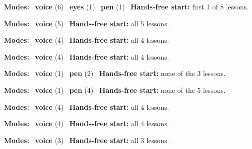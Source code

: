 \expandafter\def\csname hlchaptermodality6\endcsname{%
  {\small\noindent
    \textbf{Modes:} \hlvoicesign{}~\textbf{voice} (6) \quad \hlsightsign{}~\textbf{eyes} (1) \quad \hlpensign{}~\textbf{pen} (1)\quad
    \hlvoicesign{}~\textbf{Hands-free start:} first 1 of 8 lessons.%
    \par}\medskip
}

\expandafter\def\csname hlchaptermodality7\endcsname{%
  {\small\noindent
    \textbf{Modes:} \hlvoicesign{}~\textbf{voice} (5)\quad
    \hlvoicesign{}~\textbf{Hands-free start:} all 5 lessons.%
    \par}\medskip
}

\expandafter\def\csname hlchaptermodality8\endcsname{%
  {\small\noindent
    \textbf{Modes:} \hlvoicesign{}~\textbf{voice} (4)\quad
    \hlvoicesign{}~\textbf{Hands-free start:} all 4 lessons.%
    \par}\medskip
}

\expandafter\def\csname hlchaptermodality9\endcsname{%
  {\small\noindent
    \textbf{Modes:} \hlvoicesign{}~\textbf{voice} (4)\quad
    \hlvoicesign{}~\textbf{Hands-free start:} all 4 lessons.%
    \par}\medskip
}

\expandafter\def\csname hlchaptermodality10\endcsname{%
  {\small\noindent
    \textbf{Modes:} \hlvoicesign{}~\textbf{voice} (1) \quad \hlpensign{}~\textbf{pen} (2)\quad
    \hlvoicesign{}~\textbf{Hands-free start:} none of the 3 lessons.%
    \par}\medskip
}

\expandafter\def\csname hlchaptermodality11\endcsname{%
  {\small\noindent
    \textbf{Modes:} \hlvoicesign{}~\textbf{voice} (1) \quad \hlpensign{}~\textbf{pen} (4)\quad
    \hlvoicesign{}~\textbf{Hands-free start:} none of the 5 lessons.%
    \par}\medskip
}

\expandafter\def\csname hlchaptermodality12\endcsname{%
  {\small\noindent
    \textbf{Modes:} \hlvoicesign{}~\textbf{voice} (4)\quad
    \hlvoicesign{}~\textbf{Hands-free start:} all 4 lessons.%
    \par}\medskip
}

\expandafter\def\csname hlchaptermodality13\endcsname{%
  {\small\noindent
    \textbf{Modes:} \hlvoicesign{}~\textbf{voice} (4)\quad
    \hlvoicesign{}~\textbf{Hands-free start:} all 4 lessons.%
    \par}\medskip
}

\expandafter\def\csname hlchaptermodality14\endcsname{%
  {\small\noindent
    \textbf{Modes:} \hlvoicesign{}~\textbf{voice} (3)\quad
    \hlvoicesign{}~\textbf{Hands-free start:} all 3 lessons.%
    \par}\medskip
}

